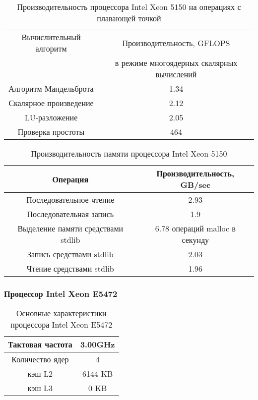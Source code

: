 \begin{table}[ht]
	\begin{center}
		\caption{Производительность процессора Intel Xeon  5150 на операциях с плавающей точкой}
		\begin{tabular}{|c|c|}
			\hline	
			Вычислительный алгоритм &  Производительность, GFLOPS \\ 
			& в режиме многоядерных скалярных вычислений \\ \hline
			Алгоритм Мандельброта  &  1.34 	\\ \hline
			Скалярное произведение &  2.12   \\ \hline
			LU-разложение          &  2.05   \\ \hline
			Проверка простоты      &  464  \\ \hline 
			
			
		\end{tabular}
	\end{center} 	
\end{table} 	

\begin{table}[ht]
	\begin{center}
		\caption{Производительность памяти процессора Intel Xeon 5150}
		\begin{tabular}{|c|c|}
			\hline	
			Операция  &  Производительность, GB/sec \\ \hline
			Последовательное чтение &  2.93 	\\  \hline
			Последовательная запись &  1.9   \\  \hline
			Выделение памяти средствами stdlib &  6.78 операций malloc в секунду  \\  \hline
			Запись средствами stdlib  & 2.03  \\ \hline
			Чтение средствами stdlib  & 1.96  \\ \hline 
		\end{tabular}
	\end{center} 	
\end{table} 	

\clearpage

\subsubsection{Процессор Intel Xeon E5472}
\begin{table}[ht]
	\begin{center}
		\caption{Основные характеристики процессора Intel Xeon  E5472}
		\begin{tabular}{|c|c|}
			\hline	
			Тактовая частота & 3.00GHz   \\ \hline
			Количество ядер & 4 	     \\ \hline
			кэш L2         &  6144 KB      \\ \hline
			кэш L3         &  0 KB        \\ \hline
		\end{tabular}
	\end{center} 	
\end{table} 	

